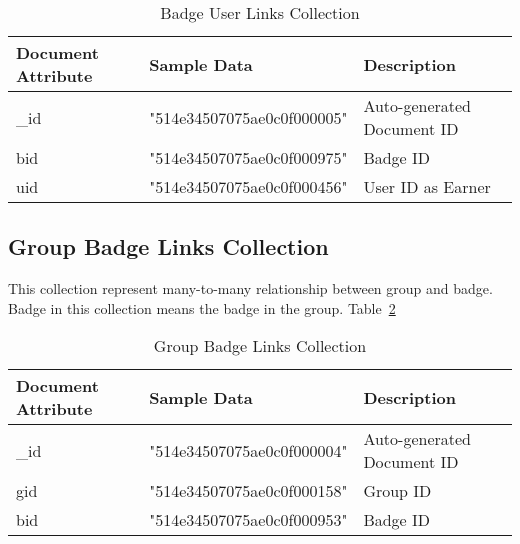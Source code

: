 \begin{table}[H]
\caption{Badge User Links Collection}\label{table:BadgeUserLinksCollection}
\textbf{ }
\begin{center}
\begin{tabular}{ | l | l |  l | }
\hline
Document Attribute & Sample Data & Description \\ \hline
{\_}id & "514e34507075ae0c0f000005" & Auto-generated Document ID \\ \hline
bid & "514e34507075ae0c0f000975" & Badge ID   \\ \hline
uid & "514e34507075ae0c0f000456" & User ID as Earner   \\ \hline
\end{tabular}
\end{center}
\end{table}


\subsection{Group Badge Links Collection}
This collection represent many-to-many relationship between group and badge. Badge in this collection means the badge in the group. Table~\ref{table:GroupBadgeLinksCollection}

\begin{table}[H]
\caption{Group Badge Links Collection}\label{table:GroupBadgeLinksCollection}
\textbf{ }
\begin{center}
\begin{tabular}{ | l | l |  l | }
\hline
Document Attribute & Sample Data & Description \\ \hline
{\_}id & "514e34507075ae0c0f000004" & Auto-generated Document ID \\ \hline
gid & "514e34507075ae0c0f000158" & Group ID   \\ \hline
bid & "514e34507075ae0c0f000953" & Badge ID    \\ \hline
\end{tabular}
\end{center}
\end{table}


